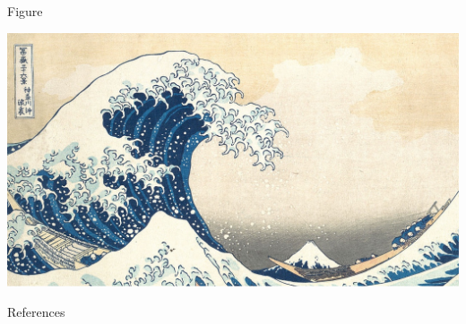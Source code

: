 \documentclass[aspectratio=169,t]{beamer}
\begin{document}
\begin{frame}{Figure}{}
  \begin{adjustbox}{width = 0.7\textwidth, center}
    \includegraphics{img/kanagawa_16_9.png}
  \end{adjustbox}
\end{frame}

\begin{frame}[allowframebreaks]{References}
    \printbibliography
\end{frame}


\appendix
\end{document}
